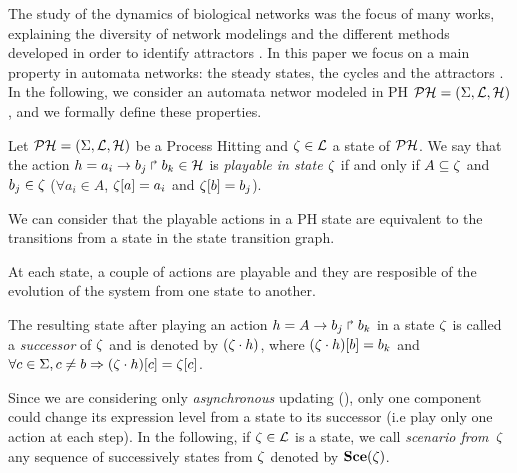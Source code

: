 The study of the dynamics of biological networks was the focus of many works, explaining the diversity of network modelings and the different methods developed in order to identify attractors \cite{skodawessely2011finding, zhang2007algorithms, mushthofa2014asp, akutsu2012finding, berntenis2013detection}.
In this paper we focus on a main property in automata networks: the steady states, the cycles and the attractors . %
In the following, we consider an automata networ modeled in PH $\mathcal{PH}=(\Sigma,\mathcal{L},\mathcal{H})$,
and we formally define these properties.

\begin{definition} 
\label{def:playableAction}
Let $\mathcal{PH} = (\Sigma,\mathcal{L},\mathcal{H})$ be a Process Hitting and $\zeta \in \mathcal{L}$ a state of $\mathcal{PH}$.
We say that the action $h = a_i\rightarrow b_j\Rsh b_k \in \mathcal{H}$
is \emph{playable in state $\zeta$} if and only if
$A \subseteq \zeta$ and $b_j \in \zeta$ (\ie$ \forall a_i \in A$, ${\zeta[a]} = a_i$ and ${\zeta[b]}=b_j$).
\end{definition}

 We can consider that the playable actions in a PH state are equivalent to the transitions from a state in the state transition graph.

 At each state, a couple of actions are playable and they are resposible of the evolution of the system from one state to another.

\begin{Lemma}
The resulting state after playing an action $h= A\rightarrow b_j\Rsh b_k$ in a state $\zeta$
is called a \emph{successor} of $\zeta$ and
is denoted by $(\zeta \cdot h)$,
where ${(\zeta \cdot h)[b]} = b_k$ and
$\forall c \in \Sigma, c \neq b \Rightarrow {(\zeta\cdot h)[c]}={\zeta[c]}$.
\end{Lemma}

Since we are considering only \emph{asynchronous} updating (), only one component could change its expression level from a state to its successor (i.e play only one action at each step). In the following, if $\zeta \in \mathcal{L}$ is a state,
we call \emph{scenario from~$\zeta$}
any sequence of successively states from $\zeta$ denoted by $\mathbf{Sce}(\zeta)$. \\

